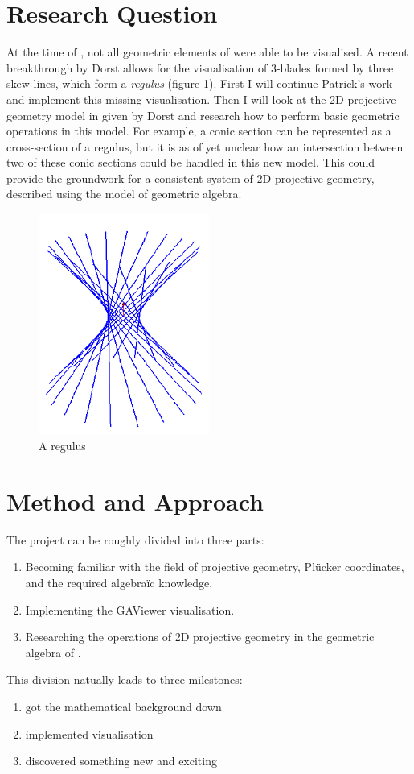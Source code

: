 \documentclass[a4paper, 10pt]{article}
\begin{document}
\section{Research Question}
At the time of \cite{dekok2012}, not all geometric elements of \rp were able to
be visualised. A recent breakthrough by Dorst allows for the visualisation of
3-blades formed by three skew lines, which form a \emph{regulus} (figure
\ref{fig:regulus}). First I will continue Patrick's work and implement this
missing visualisation. Then I will look at the 2D projective geometry model in
\rp given by Dorst and research how to perform basic geometric operations in
this model. For example, a conic section can be represented as a cross-section
of a regulus, but it is as of yet unclear how an intersection between two of
these conic sections could be handled in this new model. This could provide the
groundwork for a consistent system of 2D projective geometry, described using
the \rp model of geometric algebra.

\begin{figure}[htbp]
  \centering
  \includegraphics[width=0.5\textwidth]{regulus.png}
  \caption{A regulus}
  \label{fig:regulus}
\end{figure}

\section{Method and Approach}
The project can be roughly divided into three parts:
\begin{enumerate}
\item Becoming familiar with the field of projective geometry, Pl\"{u}cker
  coordinates, and the required algebra\"{i}c knowledge.
\item Implementing the GAViewer visualisation.
\item Researching the operations of 2D projective geometry in the geometric
  algebra of \rp.
\end{enumerate}
This division natually leads to three milestones:
\begin{enumerate}
\item got the mathematical background down
\item implemented visualisation
\item discovered something new and exciting
\end{enumerate}
\end{document}
